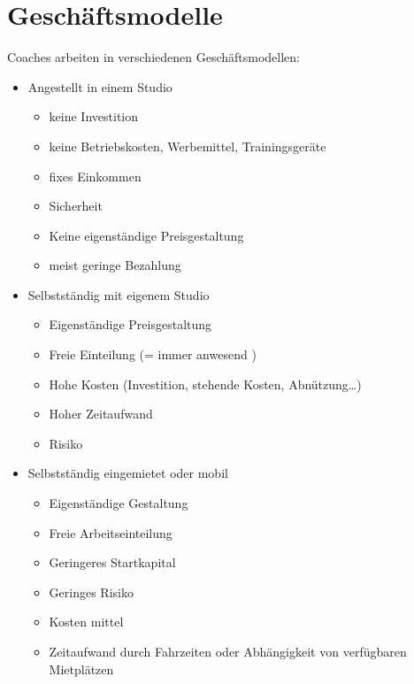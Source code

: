 \documentclass[
  letterpaper,
  DIV=11,
  numbers=noendperiod]{scrreprt}
\providecommand{\tightlist}{%
  \setlength{\itemsep}{0pt}\setlength{\parskip}{0pt}}
\begin{document}
\section{Geschäftsmodelle}\label{geschuxe4ftsmodelle}

Coaches arbeiten in verschiedenen Geschäftsmodellen:

\begin{itemize}
\tightlist
\item
  Angestellt in einem Studio

  \begin{itemize}
  \tightlist
  \item
    keine Investition
  \item
    keine Betriebskosten, Werbemittel, Trainingsgeräte
  \item
    fixes Einkommen
  \item
    Sicherheit
  \item
    Keine eigenständige Preisgestaltung
  \item
    meist geringe Bezahlung
  \end{itemize}
\item
  Selbstständig mit eigenem Studio

  \begin{itemize}
  \tightlist
  \item
    Eigenständige Preisgestaltung
  \item
    Freie Einteilung (= immer anwesend )
  \item
    Hohe Kosten (Investition, stehende Kosten, Abnützung\ldots)
  \item
    Hoher Zeitaufwand
  \item
    Risiko
  \end{itemize}
\item
  Selbstständig eingemietet oder mobil

  \begin{itemize}
  \tightlist
  \item
    Eigenständige Gestaltung
  \item
    Freie Arbeitseinteilung
  \item
    Geringeres Startkapital
  \item
    Geringes Risiko
  \item
    Kosten mittel
  \item
    Zeitaufwand durch Fahrzeiten oder Abhängigkeit von verfügbaren
    Mietplätzen
  \end{itemize}
\end{itemize}
\end{document}
